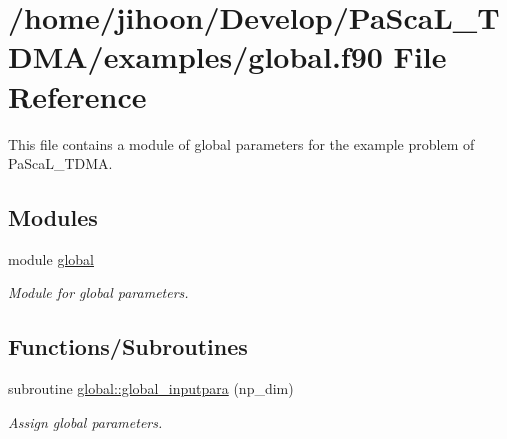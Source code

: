 \hypertarget{global_8f90}{}\section{/home/jihoon/\+Develop/\+Pa\+Sca\+L\+\_\+\+T\+D\+M\+A/examples/global.f90 File Reference}
\label{global_8f90}


This file contains a module of global parameters for the example problem of Pa\+Sca\+L\+\_\+\+T\+D\+MA.  


\subsection*{Modules}
\begin{DoxyCompactItemize}
\item 
module \hyperlink{namespaceglobal}{global}
\begin{DoxyCompactList}\small\item\em Module for global parameters. \end{DoxyCompactList}\end{DoxyCompactItemize}
\subsection*{Functions/\+Subroutines}
\begin{DoxyCompactItemize}
\item 
subroutine \hyperlink{namespaceglobal_a930b565da2644b675f35b91735e11ce3}{global\+::global\+\_\+inputpara} (np\+\_\+dim)
\begin{DoxyCompactList}\small\item\em Assign global parameters. \end{DoxyCompactList}\end{DoxyCompactItemize}
